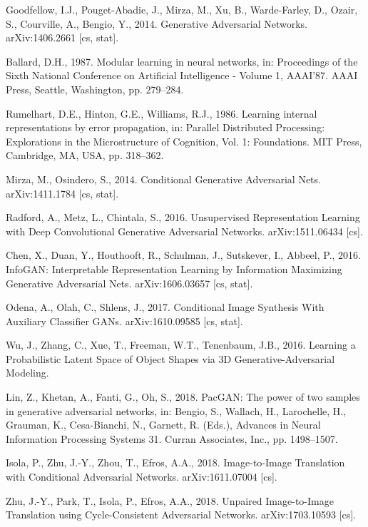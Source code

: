 \documentclass[conference]{IEEEtran}
\begin{document}
\begin{thebibliography}{00}
 Goodfellow, I.J., Pouget-Abadie, J., Mirza, M., Xu, B., Warde-Farley, D., Ozair, S., Courville, A., Bengio, Y., 2014. Generative Adversarial Networks. arXiv:1406.2661 [cs, stat].

 Ballard, D.H., 1987. Modular learning in neural networks, in: Proceedings of the Sixth National Conference on Artificial Intelligence - Volume 1, AAAI’87. AAAI Press, Seattle, Washington, pp. 279–284.

 Rumelhart, D.E., Hinton, G.E., Williams, R.J., 1986. Learning internal representations by error propagation, in: Parallel Distributed Processing: Explorations in the Microstructure of Cognition, Vol. 1: Foundations. MIT Press, Cambridge, MA, USA, pp. 318–362.

 Mirza, M., Osindero, S., 2014. Conditional Generative Adversarial Nets. arXiv:1411.1784 [cs, stat].

 Radford, A., Metz, L., Chintala, S., 2016. Unsupervised Representation Learning with Deep Convolutional Generative Adversarial Networks. arXiv:1511.06434 [cs].

 Chen, X., Duan, Y., Houthooft, R., Schulman, J., Sutskever, I., Abbeel, P., 2016. InfoGAN: Interpretable Representation Learning by Information Maximizing Generative Adversarial Nets. arXiv:1606.03657 [cs, stat].

 Odena, A., Olah, C., Shlens, J., 2017. Conditional Image Synthesis With Auxiliary Classifier GANs. arXiv:1610.09585 [cs, stat].

 Wu, J., Zhang, C., Xue, T., Freeman, W.T., Tenenbaum, J.B., 2016. Learning a Probabilistic Latent Space of Object Shapes via 3D Generative-Adversarial Modeling.

 Lin, Z., Khetan, A., Fanti, G., Oh, S., 2018. PacGAN: The power of two samples in generative adversarial networks, in: Bengio, S., Wallach, H., Larochelle, H., Grauman, K., Cesa-Bianchi, N., Garnett, R. (Eds.), Advances in Neural Information Processing Systems 31. Curran Associates, Inc., pp. 1498–1507.

 Isola, P., Zhu, J.-Y., Zhou, T., Efros, A.A., 2018. Image-to-Image Translation with Conditional Adversarial Networks. arXiv:1611.07004 [cs].

 Zhu, J.-Y., Park, T., Isola, P., Efros, A.A., 2018. Unpaired Image-to-Image Translation using Cycle-Consistent Adversarial Networks. arXiv:1703.10593 [cs].


\end{thebibliography}
\end{document}
